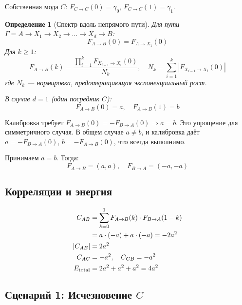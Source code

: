 \documentclass[11pt,a4paper]{article}
\newtheorem{definition}{Определение}[section]
\theoremstyle{definition}
\begin{document}
Собственная мода $C$: $F_{C \to C}(0) = \gamma_0$, $F_{C \to C}(1) = \gamma_1$.

\begin{definition}[Спектр вдоль непрямого пути]
Для пути $\Gamma = A \to X_1 \to X_2 \to \dots \to X_d \to B$:
\begin{equation}
    F_{A \to B}(0) = F_{A \to X_1}(0)
\end{equation}
Для $k \geq 1$:
\begin{equation}
    F_{A \to B}(k) = \frac{\prod_{i=1}^{k} F_{X_{i-1} \to X_i}(0)}{N_k}, \quad N_k = \sum_{i=1}^{k} |F_{X_{i-1} \to X_i}(0)|
\end{equation}
где $N_k$ --- нормировка, предотвращающая экспоненциальный рост.

В случае $d=1$ (один посредник $C$):
\begin{equation}
    F_{A \to B}(0) = a, \quad F_{A \to B}(1) = b
\end{equation}
\end{definition}

Калибровка требует $F_{A \to B}(0) = -F_{B \to A}(0) \Rightarrow a = b$. Это упрощение для симметричного случая. В общем случае $a \neq b$, и калибровка даёт $a = -F_{B \to A}(0)$, $b = -F_{A \to B}(0)$, что всегда выполнимо.

Принимаем $a = b$. Тогда:
\begin{equation}
    F_{A \to B} = (a, a), \quad F_{B \to A} = (-a, -a)
\end{equation}

\subsection{Корреляции и энергия}

\begin{align}
    C_{AB} &= \sum_{k=0}^{1} F_{A \to B}(k) \cdot F_{B \to A}(1-k) \notag\\
           &= a \cdot (-a) + a \cdot (-a) = -2a^2 \\
    |C_{AB}| &= 2a^2 \\
    C_{AC} &= -a^2, \quad C_{CB} = -a^2 \\
    E_{\text{total}} &= 2a^2 + a^2 + a^2 = 4a^2
\end{align}

\subsection{Сценарий 1: Исчезновение $C$}
\end{document}
